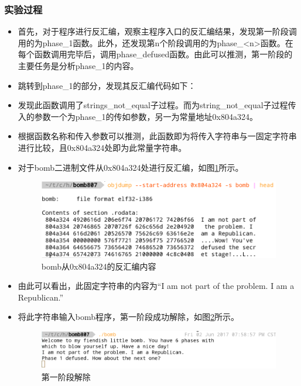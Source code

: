 \subsubsection{实验过程}
\begin{itemize}
	\item 首先，对于程序进行反汇编，观察主程序入口的反汇编结果，发现第一阶段调用的为phase\_1函数。此外，还发现第n个阶段调用的为phase\_<n>函数。在每个函数调用完毕后，调用phase\_defused函数。由此可以推测，第一阶段的主要任务是分析phase\_1的内容。
	\item 跳转到phase\_1的部分，发现其反汇编代码如下：
		\begin{codeFont}
			
		\end{codeFont}
	\item 发现此函数调用了strings\_not\_equal子过程。而为string\_not\_equal子过程传入的参数一个为phase\_1的传如参数，另一为常量地址0x804a324。
	\item 根据函数名称和传入参数可以推测，此函数即为将传入字符串与一固定字符串进行比较，且0x804a324处即为此常量字符串。
	\item 对于bomb二进制文件从0x804a324处进行反汇编，如图\ref{fig:fig1}所示。
		\begin{figure}[H]
			\centering
			\includegraphics[width=0.95\linewidth]{resources/fig1.png}
			\caption{bomb从0x804a324的反汇编内容}
			\label{fig:fig1}
		\end{figure}
	\item 由此可以看出，此固定字符串的内容为``I am not part of the problem. I am a Republican.''
	\item 将此字符串输入bomb程序，第一阶段成功解除，如图\ref{fig:fig2}所示。
		\begin{figure}[H]
			\centering
			\includegraphics[width=0.95\linewidth]{resources/fig2.png}
			\caption{第一阶段解除}
			\label{fig:fig2}
		\end{figure}
\end{itemize}

